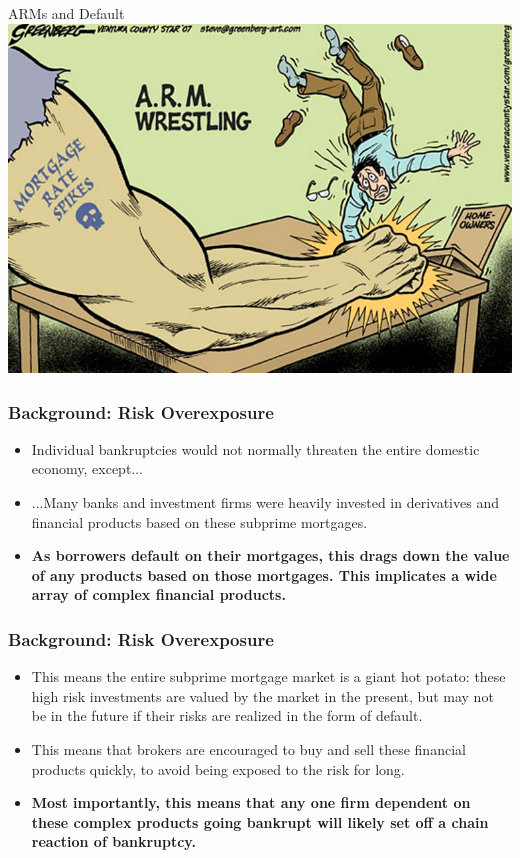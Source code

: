 \documentclass[handout]{beamer}
\begin{document}
\begin{frame}{\LARGE ARMs and Default}
	\centering
	\includegraphics[width=\textwidth,height=.8\textheight,keepaspectratio]{Picture2.jpg}
\end{frame}

\begin{frame} 
	\frametitle{\LARGE{Background: Risk Overexposure}}
	\begin{itemize}
		\item Individual bankruptcies would not normally threaten the entire domestic economy, except...	
		\item ...Many banks and investment firms were heavily invested in derivatives and financial products based on these subprime mortgages. \pause
		\item \textbf{As borrowers default on their mortgages, this drags down the value of any products based on those mortgages. This implicates a wide array of complex financial products.} 
		
	\end{itemize}
\end{frame}

\begin{frame} 
	\frametitle{\LARGE{Background: Risk Overexposure}}
	\begin{itemize}
		\item This means the entire subprime mortgage market is a giant hot potato: these high risk investments are valued by the market in the present, but may not be in the future if their risks are realized in the form of default. \pause
		\item This means that brokers are encouraged to buy and sell these financial products quickly, to avoid being exposed to the risk for long. \pause
		\item \textbf{Most importantly, this means that any one firm dependent on these complex products going bankrupt will likely set off a chain reaction of bankruptcy.}
	\end{itemize}
\end{frame}
\end{document}
